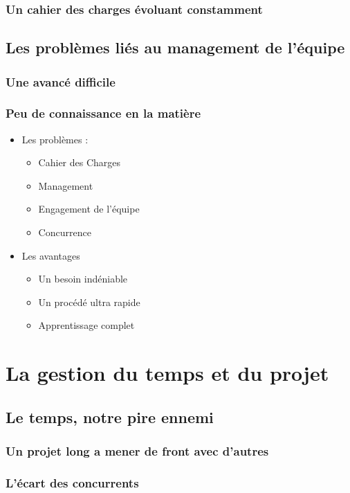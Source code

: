 \documentclass{article}
\begin{document}
\subsubsection{Un cahier des charges évoluant constamment}
\subsection{Les problèmes liés au management de l'équipe}
\subsubsection{Une avancé difficile}
\subsubsection{Peu de connaissance en la matière}

\begin{itemize}
\item Les problèmes :
\begin{itemize}
\item Cahier des Charges
\item Management
\item Engagement de l'équipe
\item Concurrence
\end{itemize}
\item Les avantages
\begin{itemize}
\item Un besoin indéniable
\item Un procédé ultra rapide
\item Apprentissage complet
\end{itemize}
\end{itemize}

\section{La gestion du temps et du projet}
\subsection{Le temps, notre pire ennemi}
\subsubsection{Un projet long a mener de front avec d'autres}
\subsubsection{L'écart des concurrents}
\end{document}
